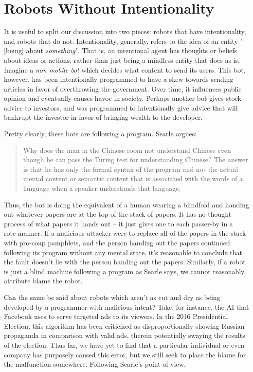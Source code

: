 \documentclass[12]{article}
\begin{document}
\section{Robots Without Intentionality}
	It is useful to split our discussion into two pieces: robots that have intentionality, and robots that do not. Intentionality, generally, refers to the idea of an entity "[being] about \textit{something}"\cite{intentionality}. That is, an intentional agent has thoughts or beliefs about ideas or actions, rather than just being a mindless entity that does as is. Imagine a \textit{non mobile bot} which decides what content to send its users. This bot, however, has been intentionally programmed to have a skew towards sending articles in favor of overthrowing the government. Over time, it influences public opinion and eventually causes havoc in society. Perhaps another bot gives stock advice to investors, and was programmed to intentionally give advice that will bankrupt the investor in favor of bringing wealth to the developer.
	
	Pretty clearly, these bots are following a program. Searle argues:
	
	\begin{quote}
		Why does the man in the Chinese room not understand Chinese even though he can pass the Turing test for understanding Chinese? The answer is that he has only the formal syntax of the program and not the actual mental content or semantic content that is associated with the words of a language when a speaker understands that language\cite{chinese_room_1, chinese_room_2}.
	\end{quote}
	
	Thus, the bot is doing the equivalent of a human wearing a blindfold and handing out whatever papers are at the top of the stack of papers. It has no thought process of what papers it hands out -- it just gives one to each passer-by in a rote-manner. If a malicious attacker were to replace all of the papers in the stack with pro-coup pamphlets, and the person handing out the papers continued following its program without any mental state, it's reasonable to conclude that the fault doesn't lie with the person handing out the papers. Similarly, if a robot is just a blind machine following a program as Searle says, we cannot reasonably attribute blame the robot. 
	
	Can the same be said about robots which aren't as cut and dry as being developed by a programmer with malicious intent? Take, for instance, the AI that Facebook uses to serve targeted ads to its viewers. In the 2016 Presidential Election, this algorithm has been criticized as disproportionally showing Russian propaganda\cite{facebook_russia} in comparison with valid ads, therein potentially swaying the results of the election. Thus far, we have yet to find that a particular individual or even company has purposely caused this error, but we still seek to place the blame for the malfunction somewhere. Following Searle's point of view.
	
\end{document}
